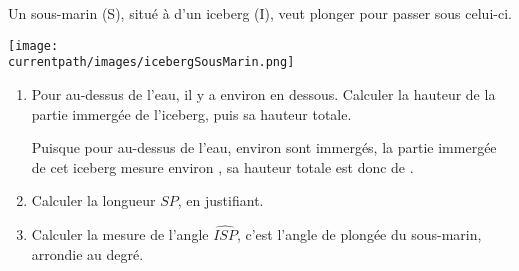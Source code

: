     Un sous-marin (S), situé à  d'un iceberg (I), veut plonger pour passer sous celui-ci.

    \texttt{[image: \\currentpath/images/icebergSousMarin.png]}

    \begin{enumerate}
        \item Pour  au-dessus de l'eau, il y a environ  en dessous. Calculer la hauteur de la partie immergée de l'iceberg, puis sa hauteur totale.

        {\color{red}Puisque pour  au-dessus de l'eau, environ  sont immergés, la partie immergée de cet iceberg mesure environ , sa hauteur totale est donc de .}
        \item Calculer la longueur $SP$, en justifiant.

        {\color{red}}
        \item Calculer la mesure de l'angle $\widehat{ISP}$, c'est l'angle de plongée du sous-marin, arrondie au degré.

        {\color{red}}
    \end{enumerate}

